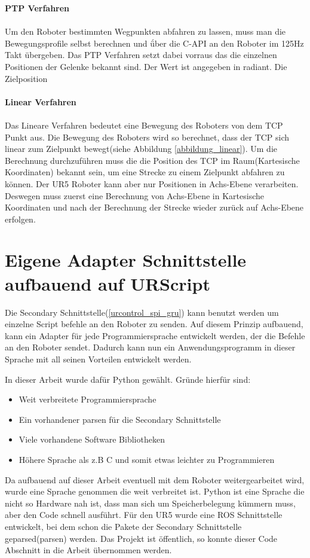 \textbf{\acs{PTP} Verfahren}
\\\\
Um den Roboter bestimmten Wegpunkten abfahren zu lassen, muss man die Bewegungsprofile selbst berechnen und ǘber die C-API an den Roboter im 125Hz Takt übergeben. Das \ac{PTP} Verfahren setzt dabei vorraus das die einzelnen Positionen der Gelenke bekannt sind. Der Wert ist angegeben in radiant. Die Zielposition
\\\\
\textbf{Linear Verfahren}
\\\\
Das Lineare Verfahren bedeutet eine Bewegung des Roboters von dem \ac{TCP} Punkt aus. Die Bewegung des Roboters wird so berechnet, dass der \acs{TCP} sich linear zum Zielpunkt bewegt(siehe Abbildung \ref{abbildung_linear}).
Um die Berechnung durchzuführen muss die die Position des \acs{TCP} im Raum(Kartesische Koordinaten) bekannt sein, um eine Strecke zu einem Zielpunkt abfahren zu können. Der UR5 Roboter kann aber nur Positionen in Achs-Ebene verarbeiten. Deswegen muss zuerst eine Berechnung von Achs-Ebene in Kartesische Koordinaten und nach der Berechnung der Strecke wieder zurück auf Achs-Ebene erfolgen.

\section{Eigene Adapter Schnittstelle aufbauend auf URScript}
\label{sec:urscript_adapter}

Die Secondary Schnittstelle(\ref{urcontrol_spi_gru}) kann benutzt werden um einzelne Script befehle an den Roboter zu senden. Auf diesem Prinzip aufbauend, kann ein Adapter für jede Programmiersprache entwickelt werden, der die Befehle an den Roboter sendet. Dadurch kann nun ein Anwendungsprogramm in dieser Sprache mit all seinen Vorteilen entwickelt werden.

In dieser Arbeit wurde dafür Python gewählt. Gründe hierfür sind:

\begin{itemize}
\item Weit verbreitete Programmiersprache
\item Ein vorhandener \acl{parsen} für die Secondary Schnittstelle
\item Viele vorhandene \acs{Software Bibliotheken}
\item Höhere Sprache als z.B C und somit etwas leichter zu Programmieren
\end{itemize}

Da aufbauend auf dieser Arbeit eventuell mit dem Roboter weitergearbeitet wird, wurde eine Sprache genommen die weit verbreitet ist. Python ist eine Sprache die nicht so Hardware nah ist, dass man sich um Speicherbelegung kümmern muss, aber den Code schnell ausführt.
Für den UR5 wurde eine \ac{ROS} Schnittstelle entwickelt, bei dem schon die Pakete der Secondary Schnittstelle geparsed(\acl{parsen}) werden. Das Projekt ist öffentlich, so konnte dieser Code Abschnitt in die Arbeit übernommen werden.